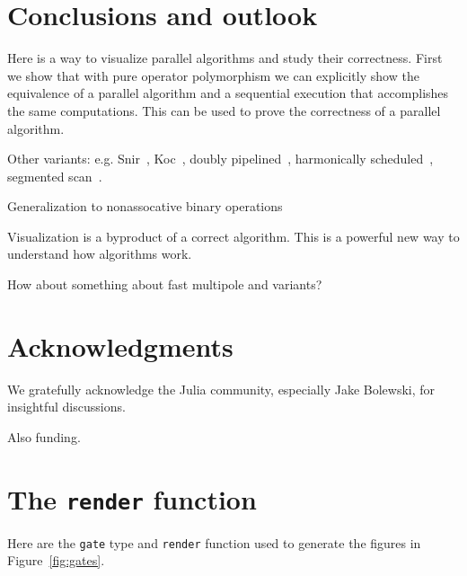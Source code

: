 \documentclass{sig-alternate}
\newcommand{\code}[1]{\texttt{#1}}
\begin{document}
\section{Conclusions and outlook}

Here is a way to visualize parallel algorithms and study their correctness. First we show that with pure operator polymorphism we can explicitly show the equivalence of a parallel algorithm and a sequential execution that accomplishes the same computations. This can be used to prove the correctness of a parallel algorithm.

Other variants: e.g. Snir~\cite{Kruskal1985}, Koc~\cite{Egecioglu1992}, doubly pipelined~\cite{Sanders2006}, harmonically scheduled~\cite{Wang1996}, segmented scan~\cite{Sengupta2007}.

Generalization to nonassocative binary operations~\cite{Chen1992}

Visualization is a byproduct of a correct algorithm. This is a powerful new way to understand how algorithms work.

How about something about fast multipole and variants?

\section{Acknowledgments}
We gratefully acknowledge the Julia community, especially Jake Bolewski, for insightful discussions.

Also funding.




\appendix

\section{The \code{render} function}
\label{sec:render}

Here are the \code{gate} type and \code{render} function used to generate the figures in Figure~\ref{fig:gates}.
\end{document}
